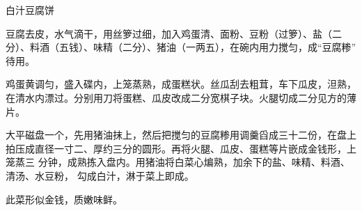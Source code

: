 %
%
%
%
%
%
%
\begin{recipe}[金钱豆腐]{白汁豆腐饼}

\ingredients


\preparation

\step 豆腐去皮，水气滴干，用丝箩过细，加入鸡蛋清、面粉、豆粉（过箩）、盐（二
分）、料酒（五钱）、味精（二分）、猪油（一两五），在碗内用力搅匀，成“豆腐糁”
待用。

\step 鸡蛋黄调匀，盛入碟内，上笼蒸熟，成蛋糕状。丝瓜刮去粗茸，车下瓜皮，泹熟，
在清水内漂过。分别用刀将蛋糕、瓜皮改成二分宽棋子块。火腿切成二分见方的薄片。

\step 大平磁盘一个，先用猪油抹上，然后把搅匀的豆腐糁用调羹舀成三十二份，在盘上
拍压成直径一寸二、厚约三分的圆形。再将火腿、瓜皮、蛋糕等片嵌成金钱形，上笼蒸三
分钟，成熟拣入盘内。用猪油将白菜心煸熟，加余下的盐、味精、料酒、清汤、水豆粉，
勾成白汁，淋于菜上即成。

\features

此菜形似金钱，质嫩味鲜。

\end{recipe}

